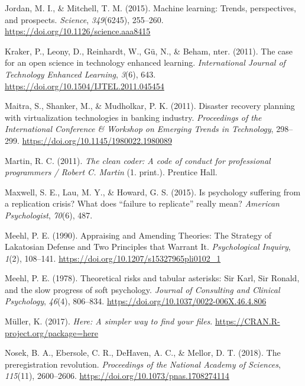 \documentclass[12pt,a4paper,twoside]{article}
\begin{document}
\leavevmode\hypertarget{ref-jordanMachineLearningTrends2015}{}%
Jordan, M. I., \& Mitchell, T. M. (2015). Machine learning: Trends, perspectives, and prospects. \emph{Science}, \emph{349}(6245), 255--260. \url{https://doi.org/10.1126/science.aaa8415}

\leavevmode\hypertarget{ref-krakerCaseOpenScience2011}{}%
Kraker, P., Leony, D., Reinhardt, W., Gü, N., \& Beham, nter. (2011). The case for an open science in technology enhanced learning. \emph{International Journal of Technology Enhanced Learning}, \emph{3}(6), 643. \url{https://doi.org/10.1504/IJTEL.2011.045454}

\leavevmode\hypertarget{ref-maitraDisasterRecoveryPlanning2011}{}%
Maitra, S., Shanker, M., \& Mudholkar, P. K. (2011). Disaster recovery planning with virtualization technologies in banking industry. \emph{Proceedings of the International Conference \& Workshop on Emerging Trends in Technology}, 298--299. \url{https://doi.org/10.1145/1980022.1980089}

\leavevmode\hypertarget{ref-martinCleanCoderCode2011}{}%
Martin, R. C. (2011). \emph{The clean coder: A code of conduct for professional programmers / Robert C. Martin} (1. print.). Prentice Hall.

\leavevmode\hypertarget{ref-maxwellPsychologySufferingReplication2015}{}%
Maxwell, S. E., Lau, M. Y., \& Howard, G. S. (2015). Is psychology suffering from a replication crisis? What does ``failure to replicate'' really mean? \emph{American Psychologist}, \emph{70}(6), 487.

\leavevmode\hypertarget{ref-meehlAppraisingAmendingTheories1990}{}%
Meehl, P. E. (1990). Appraising and Amending Theories: The Strategy of Lakatosian Defense and Two Principles that Warrant It. \emph{Psychological Inquiry}, \emph{1}(2), 108--141. \url{https://doi.org/10.1207/s15327965pli0102_1}

\leavevmode\hypertarget{ref-meehlTheoreticalRisksTabular1978}{}%
Meehl, P. E. (1978). Theoretical risks and tabular asterisks: Sir Karl, Sir Ronald, and the slow progress of soft psychology. \emph{Journal of Consulting and Clinical Psychology}, \emph{46}(4), 806--834. \url{https://doi.org/10.1037/0022-006X.46.4.806}

\leavevmode\hypertarget{ref-R-here}{}%
Müller, K. (2017). \emph{Here: A simpler way to find your files}. \url{https://CRAN.R-project.org/package=here}

\leavevmode\hypertarget{ref-nosekPreregistrationRevolution2018}{}%
Nosek, B. A., Ebersole, C. R., DeHaven, A. C., \& Mellor, D. T. (2018). The preregistration revolution. \emph{Proceedings of the National Academy of Sciences}, \emph{115}(11), 2600--2606. \url{https://doi.org/10.1073/pnas.1708274114}
\end{document}
